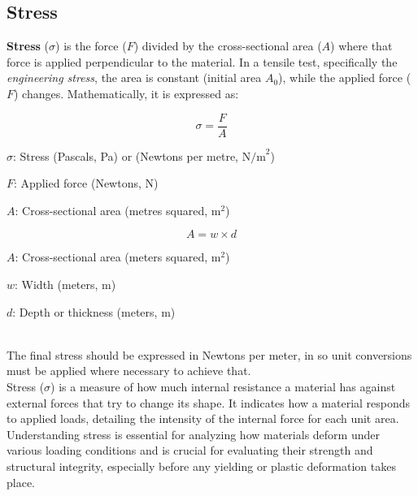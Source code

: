 \documentclass{article}
\newcommand{\wm}[1]{%
    \begin{minipage}{1\textwidth}
        #1
    \end{minipage}%
}
\begin{document}
    \newpage
     \subsection{Stress}
     \textbf{Stress} ($\sigma$) is the force (\(F\)) divided by the cross-sectional area (\(A\)) where that force is applied perpendicular to the material. In a tensile test, specifically the \textit{engineering stress}, the area is constant (initial area $A_0$), while the applied force ($F$) changes. Mathematically, it is expressed as:\\[8pt]
    \begin{minipage}{0.46\textwidth}
            \begin{equation}
                \sigma = \frac{F}{A}
                \label{eq:stress}
            \end{equation}
            \begin{itemize}[left=0pt,itemsep=-1mm]
            \wm{\item \(\sigma\): Stress (Pascals, Pa) or (Newtons per metre, \(\text{N/m}^2\))}
            \wm{\item \(F\): Applied force (Newtons, N)}
            \wm{\item \(A\): Cross-sectional area (metres squared, \(\text{m}^2\))}
            \end{itemize}
        \end{minipage}\hfill
        \begin{minipage}{0.47\textwidth}
            \begin{equation}
                A = w \times d
                \label{eq:csa}
            \end{equation}
            \begin{itemize}[left=0pt,itemsep=-1mm]
                \wm{\item \(A\): Cross-sectional area (meters squared, \(\text{m}^2\))}
                \wm{\item \(w\): Width (meters, \(\text{m}\))}
                \wm{\item \(d\): Depth or thickness (meters, \(\text{m}\))}            
            \end{itemize}
        \end{minipage}\\[8pt]
        The final stress should be expressed in Newtons per meter, in so unit conversions must be applied where necessary to achieve that.\\[8pt]
        Stress ($\sigma$) is a measure of how much internal resistance a material has against external forces that try to change its shape. It indicates how a material responds to applied loads, detailing the intensity of the internal force for each unit area.\\[8pt]
        Understanding stress is essential for analyzing how materials deform under various loading conditions and is crucial for evaluating their strength and structural integrity, especially before any yielding or plastic deformation takes place.        
\end{document}
